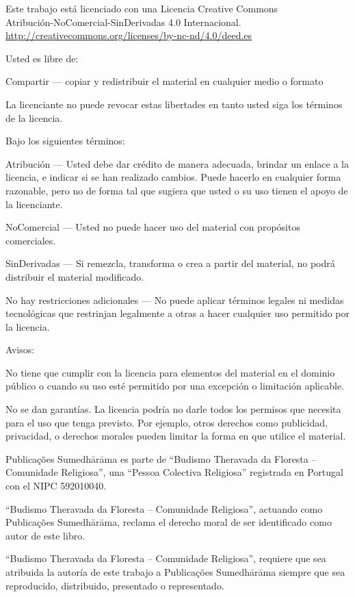 
\thispagestyle{plain}

{\small
\setlength{\parindent}{0pt}%
\raggedright\label{copyright-details}
\setlength{\parskip}{10pt}
{\centering

{\LARGE\ccbyncnd}

Este trabajo está licenciado con una Licencia Creative Commons\\
Atribución-NoComercial-SinDerivadas 4.0 Internacional.\\
\url{http://creativecommons.org/licenses/by-nc-nd/4.0/deed.es}

}

Usted es libre de:

\begin{packeditemize}
\item Compartir — copiar y redistribuir el material en cualquier medio o formato
\end{packeditemize}

La licenciante no puede revocar estas libertades en tanto usted siga los términos de la licencia.

Bajo los siguientes términos:

\begin{packeditemize}
\item Atribución — Usted debe dar crédito de manera adecuada, brindar un enlace a la licencia, e indicar si se han realizado cambios. Puede hacerlo en cualquier forma razonable, pero no de forma tal que sugiera que usted o su uso tienen el apoyo de la licenciante.
\item NoComercial — Usted no puede hacer uso del material con propósitos comerciales.
\item SinDerivadas — Si remezcla, transforma o crea a partir del material, no podrá distribuir el material modificado.
\end{packeditemize}

No hay restricciones adicionales — No puede aplicar términos legales ni medidas tecnológicas que restrinjan legalmente a otras a hacer cualquier uso permitido por la licencia.

Avisos:

No tiene que cumplir con la licencia para elementos del material en el dominio público o cuando su uso esté permitido por una excepción o limitación aplicable.

No se dan garantías. La licencia podría no darle todos los permisos que necesita para el uso que tenga previsto. Por ejemplo, otros derechos como publicidad, privacidad, o derechos morales pueden limitar la forma en que utilice el material.

Publicações Sumedhārāma es parte de ``Budismo Theravada da Floresta -- Comunidade Religiosa'', una ``Pessoa Colectiva Religiosa'' registrada en Portugal con el NIPC 592010040.

``Budismo Theravada da Floresta -- Comunidade Religiosa'', actuando como Publicações Sumedhārāma, reclama el derecho moral de ser identificado como autor de este libro.

``Budismo Theravada da Floresta -- Comunidade Religiosa'', requiere que sea atribuida la autoría de este trabajo a Publicações Sumedhārāma siempre que sea reproducido, distribuido, presentado o representado.

}
